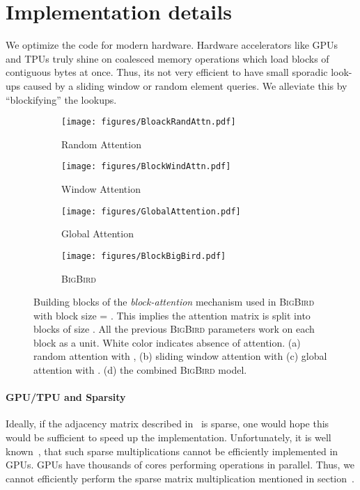 \documentclass{article}
\newcommand{\bigb}{\textsc{BigBird}\xspace}
\begin{document}
 
\newpage
\section{Implementation details}
\label{sec:apndx-impl}

We optimize the code for modern hardware.  Hardware accelerators like GPUs and TPUs truly shine on 
coalesced memory operations which load blocks of contiguous bytes at once.  Thus, its not very efficient 
to have  small sporadic  look-ups caused by a sliding window or random element queries. We alleviate this by 
``blockifying'' the  lookups.


\begin{figure}[b]
    \centering
    \begin{subfigure}{.24\textwidth}
    \texttt{[image: figures/BloackRandAttn.pdf]}
    \caption{Random Attention \label{fig:apndx_rnd_atn}}
    \end{subfigure}\hfill
    \begin{subfigure}{.24\textwidth}
    \texttt{[image: figures/BlockWindAttn.pdf]}
    \caption{Window Attention \label{fig:apndx_wnd:atn}}
    \end{subfigure}\hfill
    \begin{subfigure}{.24\textwidth}
    \texttt{[image: figures/GlobalAttention.pdf]}
    \caption{Global Attention \label{fig:apndx_gbl_atn}}
    \end{subfigure}\hfill
    \begin{subfigure}{.24\textwidth}
    \texttt{[image: figures/BlockBigBird.pdf]}
    \caption{\bigb \label{fig:apndx_bigb_atn}}
    \end{subfigure}
    \hfill
    \caption{Building blocks of the \emph{block-attention} mechanism used in \bigb with block size = . This implies the attention matrix is split into blocks of size . All the previous \bigb parameters work on each block as a unit. White color indicates absence of attention. (a) random attention with , (b) sliding window attention with  (c) global attention with . (d) the combined \bigb model.}
    \label{fig:apndx_my_label}
\end{figure}

\paragraph{GPU/TPU and Sparsity}
Ideally, if the adjacency matrix  described in~ is sparse, one would hope this would be sufficient to speed up the implementation.  
Unfortunately, it is well known~\citep{gray2017gpu,yao2019balanced}, that such sparse multiplications cannot be efficiently implemented in GPUs. GPUs have thousands of cores performing operations in parallel. Thus, we cannot efficiently perform the sparse matrix multiplication mentioned in section~.
\end{document}
